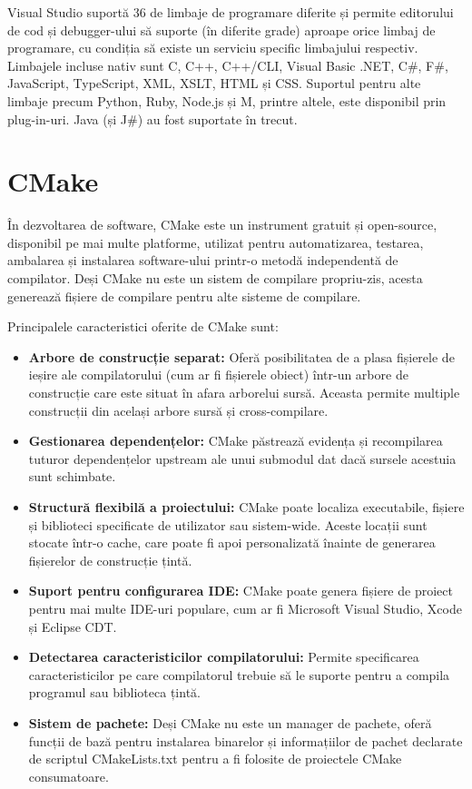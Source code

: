 \documentclass[a4paper,12pt]{report}
\begin{document}
Visual Studio suportă 36 de limbaje de programare diferite și permite editorului de cod și debugger-ului să suporte (în diferite grade) aproape orice limbaj de programare, cu condiția să existe un serviciu specific limbajului respectiv. Limbajele incluse nativ sunt C, C++, C++/CLI, Visual Basic .NET, C\#, F\#, JavaScript, TypeScript, XML, XSLT, HTML și CSS. Suportul pentru alte limbaje precum Python, Ruby, Node.js și M, printre altele, este disponibil prin plug-in-uri. Java (și J\#) au fost suportate în trecut.

\section{CMake}
În dezvoltarea de software, CMake este un instrument gratuit și open-source, disponibil pe mai multe platforme, utilizat pentru automatizarea, testarea, ambalarea și instalarea software-ului printr-o metodă independentă de compilator. Deși CMake nu este un sistem de compilare propriu-zis, acesta generează fișiere de compilare pentru alte sisteme de compilare.

Principalele caracteristici oferite de CMake sunt:
\begin{itemize}
    \item \textbf{Arbore de construcție separat:} Oferă posibilitatea de a plasa fișierele de ieșire ale compilatorului (cum ar fi fișierele obiect) într-un arbore de construcție care este situat în afara arborelui sursă. Aceasta permite multiple construcții din același arbore sursă și cross-compilare.
    \item \textbf{Gestionarea dependențelor:} CMake păstrează evidența și recompilarea tuturor dependențelor upstream ale unui submodul dat dacă sursele acestuia sunt schimbate.
    \item \textbf{Structură flexibilă a proiectului:} CMake poate localiza executabile, fișiere și biblioteci specificate de utilizator sau sistem-wide. Aceste locații sunt stocate într-o cache, care poate fi apoi personalizată înainte de generarea fișierelor de construcție țintă.
    \item \textbf{Suport pentru configurarea IDE:} CMake poate genera fișiere de proiect pentru mai multe IDE-uri populare, cum ar fi Microsoft Visual Studio, Xcode și Eclipse CDT.
    \item \textbf{Detectarea caracteristicilor compilatorului:} Permite specificarea caracteristicilor pe care compilatorul trebuie să le suporte pentru a compila programul sau biblioteca țintă.
    \item \textbf{Sistem de pachete:} Deși CMake nu este un manager de pachete, oferă funcții de bază pentru instalarea binarelor și informațiilor de pachet declarate de scriptul CMakeLists.txt pentru a fi folosite de proiectele CMake consumatoare.
\end{itemize}
\end{document}
